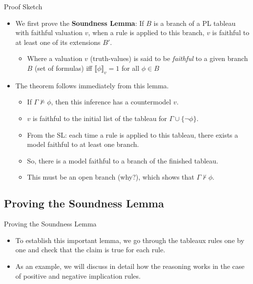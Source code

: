 \begin{frame}{Proof Sketch}

\begin{itemize}%
\itemsep=16pt

\item We first prove the \textbf{Soundness Lemma}: 
If $B$ is a branch of a PL tableau with faithful valuation $v$, when a rule is applied to this branch, $v$ is faithful to at least one of its extensions $B'$.

\smallskip

	\begin{itemize}
	\item[] Where a valuation $v$ (truth-values) is said to be \emph{faithful} to a given branch $B$ (set of formulas) iff $\llbracket\phi\rrbracket_v=1$ for all $\phi\in B$
	\end{itemize}

\item The theorem follows immediately from this lemma.
	\begin{itemize}%
	\item If $\Gamma\nvDash\phi$, then this inference has a countermodel $v$.
	\item $v$ is faithful to the initial list of the tableau for $\Gamma\cup\{\neg\phi\}$.
	\item From the SL: each time a rule is applied to this tableau, there exists a model faithful to at least one branch.
	\item So, there is a model faithful to a branch of the finished tableau.
	\item This must be an open branch \alert{(why?)}, which shows that $\Gamma\nvdash\phi$.
	\end{itemize}

\end{itemize}

\end{frame}

\subsection{Proving the Soundness Lemma}
\begin{frame}{Proving the Soundness Lemma}

\begin{itemize}%
\itemsep=16pt

\item To establish this important lemma, we go through the tableaux rules one by one and check that the claim is true for each rule.

\item As an example, we will discuss in detail how the reasoning works in the case of positive and negative implication rules.
	
\end{itemize}

\end{frame}

